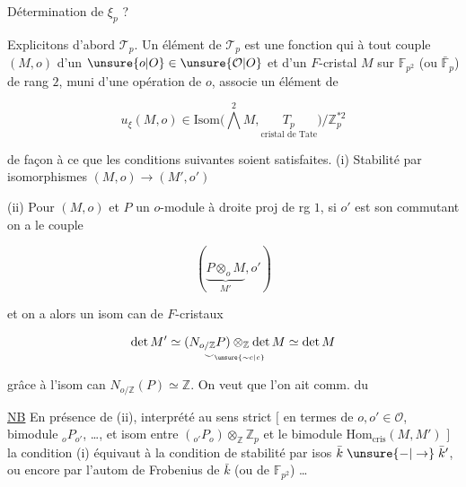 
Détermination de $\xi_p$ ?

Explicitons d'abord $\mathcal T_p$. Un élément \inserted{$\xi$} de $\mathcal T_p$ est une
fonction qui à tout couple $(M,o)$ d'un $\unsure{o|O}\in\unsure{\mathcal O|O}$
et d'un $F$-cristal $M$ sur $\mathbb F_{p^2}$ (ou  $\bar{\mathbb F}_p$) de rang $2$,
muni d'une opération de $o$, associe un  élément de

\[
u_\xi(M,o)\in\mathrm{Isom}\bigl(\bigwedge^2 M,\underset{\text{cristal de Tate}}{T_p}\bigr)/\mathbb Z_p^{*2}
\]

de façon à ce que les conditions suivantes soient satisfaites.
(i) Stabilité par isomorphismes $(M,o)\to(M',o')$

(ii) Pour $(M,o)$ et $P$ un $o$-module à droite proj de rg $1$,
si $o'$  est son commutant on a le couple

\[
(\underbrace{P\otimes_o M}_{M'},o')
\]

et on a alors un isom can de $F$-cristaux

\[
\det M'\simeq\underset{\smile_{\unsure{\sim c|c}}}{(N_{o/\mathbb Z}P)\otimes_{\mathbb Z}\det M}\simeq\det M
\]

grâce à l'isom can $N_{o/\mathbb Z}(P)\simeq\mathbb Z$. On veut que l'on ait
comm. du


\uline{NB} En présence de (ii),  interprété au sens strict
$[$ en termes de $o,o'\in\mathcal O$, bimodule $ {}_oP_{o'}$, \ldots, et
isom  entre $({}_{o'}P_o)\otimes_{\mathbb Z}\mathbb Z_p$ et le bimodule $\mathrm{Hom}_{\mathrm{cris}}(M,M')$ $]$
la condition (i) équivaut à la condition de stabilité
par isos $\bar k\mathrel{\unsure{-|\to}}\bar k'$, ou encore par l'autom de
Frobenius de $\bar k$ (ou de $\mathbb F_{p^2}$) \ldots
